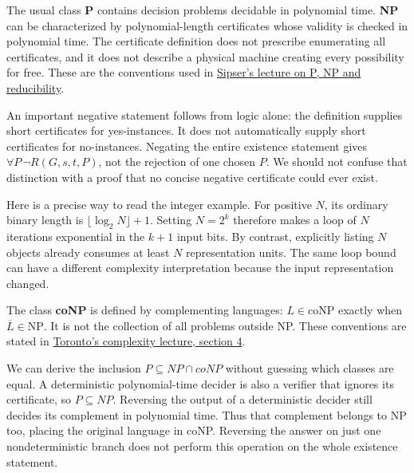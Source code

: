 The usual class \textbf{P} contains decision problems decidable in
polynomial time. \textbf{NP} can be characterized by polynomial-length
certificates whose validity is checked in polynomial time. The
certificate definition does not prescribe enumerating all certificates,
and it does not describe a physical machine creating every possibility
for free. These are the conventions used in
\href{https://ocw.mit.edu/courses/18-404j-theory-of-computation-fall-2020/45e2fd621349cfd7c9faf93a6ba134a3_MIT18_404f20_lec14.pdf}{Sipser's
lecture on P, NP and reducibility}.

An important negative statement follows from logic alone: the definition
supplies short certificates for yes-instances. It does not automatically
supply short certificates for no-instances. Negating the entire
existence statement gives \(\forall P\,\neg R(G,s,t,P)\), not the
rejection of one chosen \(P\). We should not confuse that distinction
with a proof that no concise negative certificate could ever exist.


Here is a precise way to read the integer example. For positive \(N\),
its ordinary binary length is \(\lfloor\log_2 N\rfloor+1\). Setting
\(N=2^k\) therefore makes a loop of \(N\) iterations exponential in the
\(k+1\) input bits. By contrast, explicitly listing \(N\) objects
already consumes at least \(N\) representation units. The same loop
bound can have a different complexity interpretation because the input
representation changed.

The class \textbf{coNP} is defined by complementing languages:
\(L\in\mathrm{coNP}\) exactly when \(\overline L\in\mathrm{NP}\). It is
not the collection of all problems outside NP. These conventions are
stated in
\href{https://www.cs.toronto.edu/~toni/Courses/Complexity2015/lectures/lecture3.pdf}{Toronto's
complexity lecture, section 4}.

We can derive the inclusion \(P\subseteq NP\cap coNP\) without guessing
which classes are equal. A deterministic polynomial-time decider is also
a verifier that ignores its certificate, so \(P\subseteq NP\). Reversing
the output of a deterministic decider still decides its complement in
polynomial time. Thus that complement belongs to NP too, placing the
original language in coNP. Reversing the answer on just one
nondeterministic branch does not perform this operation on the whole
existence statement.

